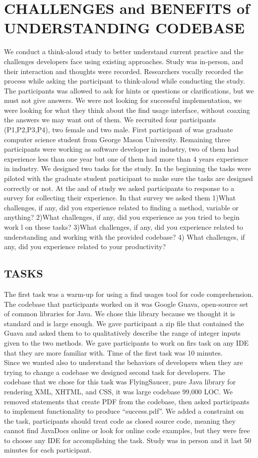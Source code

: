 \documentclass[conference]{IEEEtran}
\begin{document}
\section{CHALLENGES and BENEFITS of UNDERSTANDING CODEBASE}
We conduct a think-aloud study to better understand current practice and the challenges developers face using existing approaches. Study was in-person, and their interaction and thoughts were recorded. Researchers vocally recorded the process while asking the participant to think-aloud while conducting the study. The participants was allowed to ask for hints or questions or clarifications, but we must not give answers.
We were not looking for successful implementation, we were looking for what they think about the find usage interface, without coaxing the answers we may want out of them.
We recruited four participants (P1,P2,P3,P4), two female and two male. First participant of was graduate computer science student from George Mason University. Remaining three participants were working as software developer in industry, two of them had experience less than one year but one of them had more than 4 years experience in industry. We designed two tasks for the study. In the beginning the tasks were piloted with the graduate student participant to make sure the tasks are designed correctly or not. At the and of study we asked participants to response to a survey for collecting their experience. In that survey we asked them 1)What challenges, if any, did you experience related to finding a method, variable or anything? 2)What challenges, if any, did you experience as you tried to begin work l on these tasks? 3)What challenges, if any, did you experience related to understanding and working with the provided codebase?   4) What challenges, if any, did you experience related to your productivity? \\
\subsection{TASKS}
The first task was a warm-up for using a find usages tool for code comprehension. The codebase that participants worked on it was Google Guava, open-source set of common libraries for Java. We chose this library because we thought it is standard and is large enough. We gave participant a zip file that contained the Guava and asked them to to qualitatively describe the range of integer inputs given to the two methods. We gave participants to work on firs task on any IDE that they are more familiar with. Time of the first task was 10 minutes.\\
Since we wanted also to understand the behaviors of developers when they are trying to change a codebase we designed second task for developers. The codebase that we chose for this task was FlyingSaucer, pure Java library for rendering XML, XHTML, and CSS, it was large codebase 99,000 LOC. We removed statements that create PDF from the codebase, then asked participants to implement functionality to produce “success.pdf”. We added a constraint on the task, participants should treat code as closed source code, meaning they cannot find JavaDocs online or look for online code examples, but they were free to choose any IDE for accomplishing the task. Study was in person and it last 50 minutes for each participant. 
\end{document}
